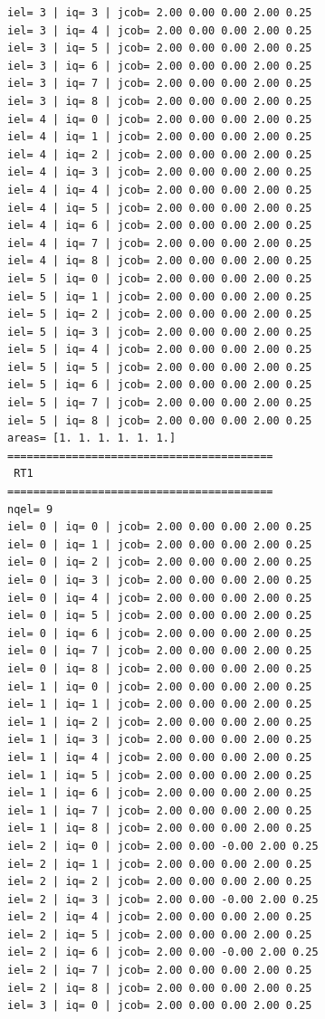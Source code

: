 \begin{tiny}
\begin{verbatim}
iel= 3 | iq= 3 | jcob= 2.00 0.00 0.00 2.00 0.25
iel= 3 | iq= 4 | jcob= 2.00 0.00 0.00 2.00 0.25
iel= 3 | iq= 5 | jcob= 2.00 0.00 0.00 2.00 0.25
iel= 3 | iq= 6 | jcob= 2.00 0.00 0.00 2.00 0.25
iel= 3 | iq= 7 | jcob= 2.00 0.00 0.00 2.00 0.25
iel= 3 | iq= 8 | jcob= 2.00 0.00 0.00 2.00 0.25
iel= 4 | iq= 0 | jcob= 2.00 0.00 0.00 2.00 0.25
iel= 4 | iq= 1 | jcob= 2.00 0.00 0.00 2.00 0.25
iel= 4 | iq= 2 | jcob= 2.00 0.00 0.00 2.00 0.25
iel= 4 | iq= 3 | jcob= 2.00 0.00 0.00 2.00 0.25
iel= 4 | iq= 4 | jcob= 2.00 0.00 0.00 2.00 0.25
iel= 4 | iq= 5 | jcob= 2.00 0.00 0.00 2.00 0.25
iel= 4 | iq= 6 | jcob= 2.00 0.00 0.00 2.00 0.25
iel= 4 | iq= 7 | jcob= 2.00 0.00 0.00 2.00 0.25
iel= 4 | iq= 8 | jcob= 2.00 0.00 0.00 2.00 0.25
iel= 5 | iq= 0 | jcob= 2.00 0.00 0.00 2.00 0.25
iel= 5 | iq= 1 | jcob= 2.00 0.00 0.00 2.00 0.25
iel= 5 | iq= 2 | jcob= 2.00 0.00 0.00 2.00 0.25
iel= 5 | iq= 3 | jcob= 2.00 0.00 0.00 2.00 0.25
iel= 5 | iq= 4 | jcob= 2.00 0.00 0.00 2.00 0.25
iel= 5 | iq= 5 | jcob= 2.00 0.00 0.00 2.00 0.25
iel= 5 | iq= 6 | jcob= 2.00 0.00 0.00 2.00 0.25
iel= 5 | iq= 7 | jcob= 2.00 0.00 0.00 2.00 0.25
iel= 5 | iq= 8 | jcob= 2.00 0.00 0.00 2.00 0.25
areas= [1. 1. 1. 1. 1. 1.]
=========================================
 RT1
=========================================
nqel= 9
iel= 0 | iq= 0 | jcob= 2.00 0.00 0.00 2.00 0.25
iel= 0 | iq= 1 | jcob= 2.00 0.00 0.00 2.00 0.25
iel= 0 | iq= 2 | jcob= 2.00 0.00 0.00 2.00 0.25
iel= 0 | iq= 3 | jcob= 2.00 0.00 0.00 2.00 0.25
iel= 0 | iq= 4 | jcob= 2.00 0.00 0.00 2.00 0.25
iel= 0 | iq= 5 | jcob= 2.00 0.00 0.00 2.00 0.25
iel= 0 | iq= 6 | jcob= 2.00 0.00 0.00 2.00 0.25
iel= 0 | iq= 7 | jcob= 2.00 0.00 0.00 2.00 0.25
iel= 0 | iq= 8 | jcob= 2.00 0.00 0.00 2.00 0.25
iel= 1 | iq= 0 | jcob= 2.00 0.00 0.00 2.00 0.25
iel= 1 | iq= 1 | jcob= 2.00 0.00 0.00 2.00 0.25
iel= 1 | iq= 2 | jcob= 2.00 0.00 0.00 2.00 0.25
iel= 1 | iq= 3 | jcob= 2.00 0.00 0.00 2.00 0.25
iel= 1 | iq= 4 | jcob= 2.00 0.00 0.00 2.00 0.25
iel= 1 | iq= 5 | jcob= 2.00 0.00 0.00 2.00 0.25
iel= 1 | iq= 6 | jcob= 2.00 0.00 0.00 2.00 0.25
iel= 1 | iq= 7 | jcob= 2.00 0.00 0.00 2.00 0.25
iel= 1 | iq= 8 | jcob= 2.00 0.00 0.00 2.00 0.25
iel= 2 | iq= 0 | jcob= 2.00 0.00 -0.00 2.00 0.25
iel= 2 | iq= 1 | jcob= 2.00 0.00 0.00 2.00 0.25
iel= 2 | iq= 2 | jcob= 2.00 0.00 0.00 2.00 0.25
iel= 2 | iq= 3 | jcob= 2.00 0.00 -0.00 2.00 0.25
iel= 2 | iq= 4 | jcob= 2.00 0.00 0.00 2.00 0.25
iel= 2 | iq= 5 | jcob= 2.00 0.00 0.00 2.00 0.25
iel= 2 | iq= 6 | jcob= 2.00 0.00 -0.00 2.00 0.25
iel= 2 | iq= 7 | jcob= 2.00 0.00 0.00 2.00 0.25
iel= 2 | iq= 8 | jcob= 2.00 0.00 0.00 2.00 0.25
iel= 3 | iq= 0 | jcob= 2.00 0.00 0.00 2.00 0.25

\end{verbatim}
\end{tiny}
